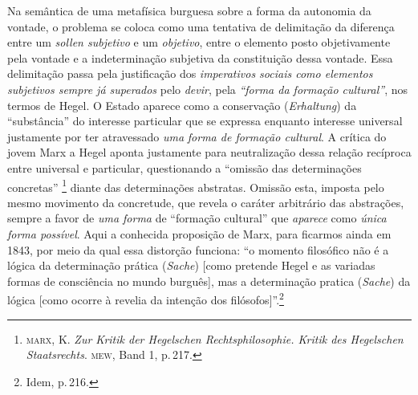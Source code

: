 Na semântica de uma metafísica burguesa sobre a forma da autonomia da
vontade, o problema se coloca como uma tentativa de delimitação da
diferença entre um \emph{sollen subjetivo} e um \emph{objetivo}, entre o
elemento posto objetivamente pela vontade e a indeterminação subjetiva
da constituição dessa vontade. Essa delimitação passa pela justificação
dos \emph{imperativos sociais como elementos subjetivos sempre já
superados} pelo \emph{devir}, pela \emph{``forma da formação
cultural''}, nos termos de Hegel. O Estado aparece como a conservação
(\emph{Erhaltung}) da ``substância'' do interesse particular que se
expressa enquanto interesse universal justamente por ter atravessado
\emph{uma} \emph{forma de formação cultural}. A crítica do jovem Marx a
Hegel aponta justamente para neutralização dessa relação recíproca entre
universal e particular, questionando a ``omissão das determinações
concretas'' \footnote{\textsc{marx}, K. \emph{Zur Kritik der Hegelschen
  Rechtsphilosophie. Kritik des Hegelschen Staatsrechts}. \textsc{mew}, Band 1,
  p.\,217.} diante das determinações abstratas. Omissão esta, imposta
pelo mesmo movimento da concretude, que revela o caráter arbitrário das
abstrações, sempre a favor de \emph{uma forma} de ``formação cultural''
que \emph{aparece} como \emph{única forma possível}. Aqui a conhecida
proposição de Marx, para ficarmos ainda em 1843, por meio da qual essa
distorção funciona: ``o momento filosófico não é a lógica da
determinação prática (\emph{Sache}) {[}como pretende Hegel e as variadas
formas de consciência no mundo burguês{]}, mas a determinação pratica
(\emph{Sache}) da lógica {[}como ocorre à revelia da intenção dos
filósofos{]}''.\footnote{Idem, p.\,216.}

